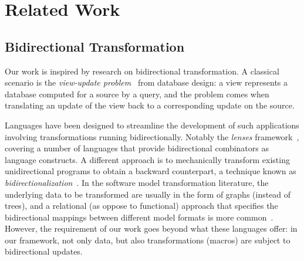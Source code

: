 \section{Related Work}
\label{sec:related}

\subsection{Bidirectional Transformation}
Our work is inspired by research on bidirectional transformation. 
A classical scenario is the \emph{view-update problem}~\cite{BaSp81,DaBe82,Hegner90,Cui2000,Fegaras2010} from database design: a view represents a database computed for 
a source by a query, and the problem comes when translating an update of the view back to a corresponding update on the source. 

Languages have been designed to streamline the development of such applications involving transformations running
bidirectionally. Notably the \emph{lenses} framework~\cite{HuMT04,MuHT04aplas,Foster:2007,BoFPPS08,FoPP08,WaGMH10,Diskin2011,Hofmann2012,FoMV12,RaLFC13}, covering a number of languages that provide bidirectional combinators as language constructs.
A different approach 
is to mechanically transform existing unidirectional programs to obtain a backward counterpart, a technique known as \emph{bidirectionalization}~\cite{MaHNHT07,Voigtlander09bff,voigtlander2010combining,WaGW11,VoHMW13,WaGMH13,MaWa13,MaWa13ppdp,WaNa14,MaWa14}. In the software model transformation literature, the underlying data to be transformed are usually in the form of graphs (instead of trees), and a relational (as oppose to functional) approach that specifies the bidirectional mappings between different 
model formats is more common~\cite{qvt,Stevens2010,Schurr1994,Schurr2008,HiHIKMN10,Hidaka:2011}. 
However, the requirement of our work goes beyond what these languages offer: in our framework, not only data, but also transformations (macros) are subject to bidirectional updates.

